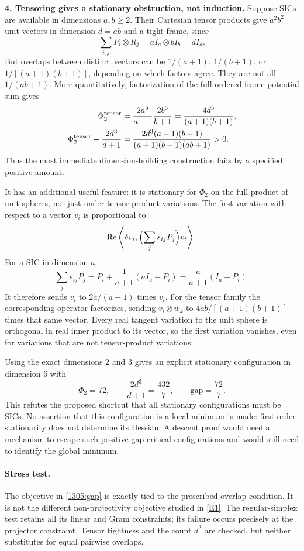 \documentclass[11pt,a4paper]{article}
\newcommand{\eref}[2]{\hyperlink{extra:#1:#2}{[E#2]}}
\numberwithin{equation}{section}
\begin{document}
\textbf{4. Tensoring gives a stationary obstruction, not induction.}
Suppose SICs are available in dimensions $a,b\geq2$. Their Cartesian
tensor products give $a^2b^2$ unit vectors in dimension $d=ab$ and a
tight frame, since
\[
 \sum_{i,j}P_i\otimes R_j=aI_a\otimes bI_b=dI_d.
\]
But overlaps between distinct vectors can be $1/(a+1)$, $1/(b+1)$,
or $1/[(a+1)(b+1)]$, depending on which factors agree. They are not all
$1/(ab+1)$. More quantitatively, factorization of the full ordered
frame-potential sum gives
\begin{align}
 \Phi_2^{\rm tensor}
    &=\frac{2a^3}{a+1}\frac{2b^3}{b+1}
      =\frac{4d^3}{(a+1)(b+1)},\notag\\
 \Phi_2^{\rm tensor}-\frac{2d^3}{d+1}
    &=\frac{2d^3(a-1)(b-1)}{(a+1)(b+1)(ab+1)}>0.
       \label{1305:tensorgap}
\end{align}
Thus the most immediate dimension-building construction fails by a
specified positive amount.

It has an additional useful feature: it is stationary for $\Phi_2$ on
the full product of unit spheres, not just under tensor-product variations.
The first variation with respect to a vector $v_i$ is proportional to
\[
 \operatorname{Re}\left\langle\delta v_i,
             \Bigl(\sum_j s_{ij}P_j\Bigr)v_i\right\rangle.
\]
For a SIC in dimension $a$,
\[
 \sum_j s_{ij}P_j
 =P_i+\frac1{a+1}(aI_a-P_i)
 =\frac{a}{a+1}(I_a+P_i).
\]
It therefore sends $v_i$ to $2a/(a+1)$ times $v_i$. For the tensor
family the corresponding operator factorizes, sending $v_i\otimes w_k$
to
$4ab/[(a+1)(b+1)]$ times that same vector. Every real tangent variation
to the unit sphere is orthogonal in real inner product to its vector,
so the first variation vanishes, even for variations that are not
tensor-product variations.

Using the exact dimensions $2$ and $3$ gives an explicit stationary
configuration in dimension $6$ with
\begin{equation}\label{1305:six}
 \Phi_2=72,\qquad \frac{2d^3}{d+1}=\frac{432}{7},\qquad
 \text{gap}=\frac{72}{7}.
\end{equation}
This refutes the proposed shortcut that all stationary configurations
must be SICs. No assertion that this configuration is a local minimum
is made: first-order stationarity does not determine its Hessian.
A descent proof would need a mechanism to escape such positive-gap
critical configurations and would still need to identify the global
minimum.

\paragraph{Stress test.}
The objective in \eqref{1305:gap} is exactly tied to the prescribed
overlap condition. It is not the different non-projectivity objective
studied in \eref{1305}{1}. The regular-simplex test retains all its
linear and Gram constraints; its failure occurs precisely at the
projector constraint. Tensor tightness and the count $d^2$ are checked,
but neither substitutes for equal pairwise overlaps.
\end{document}
